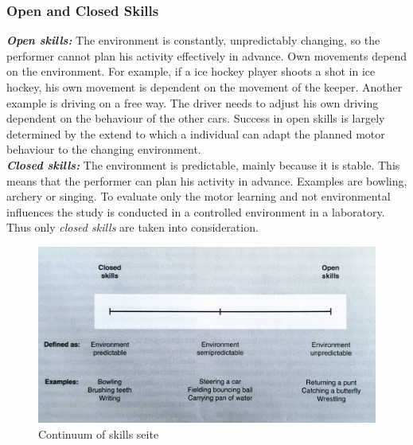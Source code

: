 \subsubsection{Open and Closed Skills}
\textit{\textbf{Open skills:}} The environment is constantly, unpredictably changing, so the performer cannot plan his activity effectively in advance. Own movements depend on the environment. For example, if a ice hockey player shoots a shot in ice hockey, his own movement is dependent on the movement of the keeper. Another example is  driving on a free way. The driver needs to adjust his own driving dependent on the behaviour of the other cars. Success in open skills is largely determined by the extend to which a individual can adapt the planned motor behaviour to the changing environment.\\
\textit{\textbf{Closed skills:}} The environment is predictable, mainly because it is stable. This means that the performer can plan his activity in advance. Examples are bowling, archery or singing. To evaluate only the motor learning and not environmental influences the study is conducted in a controlled environment in a laboratory. Thus only \textit{closed skills} are taken into consideration\markme.

\begin{figure}
	\centering
	\includegraphics[width=1.0\textwidth]{img/skills_cont.jpg}
	\caption{Continuum of skills \cite{Schmidt2011} \todo seite}
	\label{fig:skills_cont}
\end{figure}

